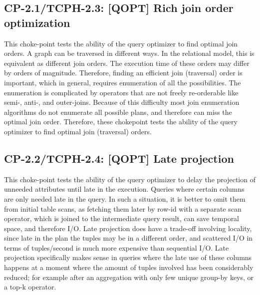 \subsection*{CP-2.1/TCPH-2.3: [QOPT]  Rich join order optimization}
\label{choke_point_2.1}
This choke-point tests the ability of the query optimizer to find optimal join orders. A graph can be traversed in different ways. In the relational model, this is equivalent as different join orders.
The execution time of these orders may differ by orders of magnitude. Therefore, finding an efficient join (traversal) order is important, which in general, requires enumeration of all the possibilities.
The enumeration is complicated by operators that are not freely re-orderable like semi-, \mbox{anti-,} and outer-joins. Because of this difficulty most join enumeration algorithms do not enumerate all possible plans, and therefore can miss the optimal join order. Therefore, these chokepoint tests the ability of the query optimizer to find optimal join (traversal) orders.



\subsection*{CP-2.2/TCPH-2.4: [QOPT]  Late projection}
\label{choke_point_2.2}
This choke-point tests the ability of the query optimizer to delay the projection of unneeded attributes until late in the execution. Queries where certain columns are only needed late in the query.
In such a situation, it is better to omit them from initial table scans, as fetching them later by row-id with a separate scan operator, which is joined to the intermediate query result, can save temporal space, and therefore I/O.
Late projection does have a trade-off involving locality, since late in the plan the tuples may be in a different order, and scattered I/O in terms of tuples/second is much more expensive than sequential I/O.
Late projection specifically makes sense in queries where the late use of these columns happens at a moment where the amount of tuples involved has been considerably reduced;
for example after an aggregation with only few unique group-by keys, or a top-k operator.



